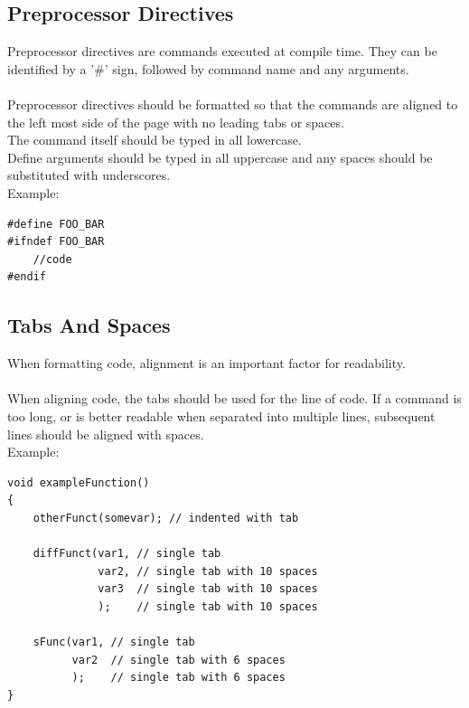 \documentclass[12pt,article]{memoir}
\begin{document}
\subsection{Preprocessor Directives}
\label{subsec:preprocessorDirectives}

Preprocessor directives are commands executed at compile time. They can be identified by a '\#' sign, followed by command name and any arguments.\\\\

\noindent
Preprocessor directives should be formatted so that the commands are aligned  to the left most side of the page with no leading tabs or spaces.\\

\noindent
The command itself should be typed in all lowercase.\\

\noindent
Define arguments should be typed in all uppercase and any spaces should be substituted with underscores.\\

\noindent
Example:
\begin{lstlisting}
#define FOO_BAR
#ifndef FOO_BAR
	//code
#endif
\end{lstlisting}

\newpage
\subsection{Tabs And Spaces}

\noindent
When formatting code, alignment is an important factor for readability.\\\\

\noindent
When aligning code, the tabs should be used for the line of code. If a command is too long, or is better readable when separated into multiple lines, subsequent lines should be aligned with spaces.\\

\noindent
Example:
\begin{lstlisting}
void exampleFunction()
{
	otherFunct(somevar); // indented with tab

	diffFunct(var1, // single tab
	          var2, // single tab with 10 spaces
	          var3  // single tab with 10 spaces
	          );	// single tab with 10 spaces
	          
	sFunc(var1, // single tab
	      var2  // single tab with 6 spaces 
	      );    // single tab with 6 spaces
}
\end{lstlisting}
\end{document}
